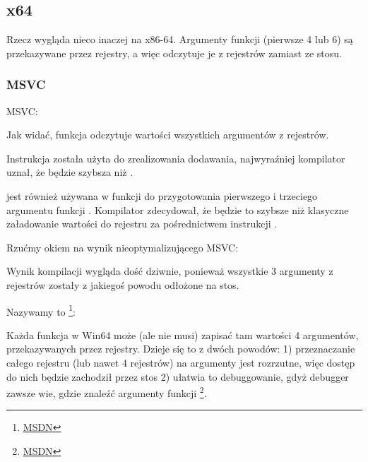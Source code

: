 \subsection{x64}


Rzecz wygląda nieco inaczej na x86-64. Argumenty funkcji (pierwsze 4 lub 6) są przekazywane przez rejestry, a więc  odczytuje je z rejestrów zamiast ze stosu.

\subsubsection{MSVC}

\Optimizing MSVC:



Jak widać, funkcja \ttf odczytuje wartości wszystkich argumentów z rejestrów.

Instrukcja \LEA została użyta do zrealizowania dodawania,
najwyraźniej kompilator uznał, że będzie szybsza niż .

\LEA jest również używana w funkcji \main do przygotowania pierwszego i trzeciego argumentu funkcji \ttf. Kompilator
zdecydował, że będzie to szybsze niż klasyczne załadowanie wartości do rejestru za pośrednictwem instrukcji \MOV.

Rzućmy okiem na wynik nieoptymalizującego MSVC:



Wynik kompilacji wygląda dość dziwnie, ponieważ wszystkie 3 argumenty z rejestrów zostały z jakiegoś powodu odłożone na stos.

\label{shadow_space}
Nazywamy to 
\footnote{\href{http://msdn.microsoft.com/en-us/library/zthk2dkh(v=vs.80).aspx}{MSDN}}: 

Każda funkcja w Win64 może (ale nie musi) zapisać tam wartości 4 argumentów, przekazywanych przez rejestry.
Dzieje się to z dwóch powodów:
1) przeznaczanie całego rejestru (lub nawet 4 rejestrów) na argumenty jest rozrzutne, więc dostęp do nich będzie zachodził przez stos
2) ułatwia to debuggowanie, gdyż debugger zawsze wie, gdzie znaleźć argumenty funkcji
\footnote{\href{http://msdn.microsoft.com/en-us/library/ew5tede7(v=VS.90).aspx}{MSDN}}.


